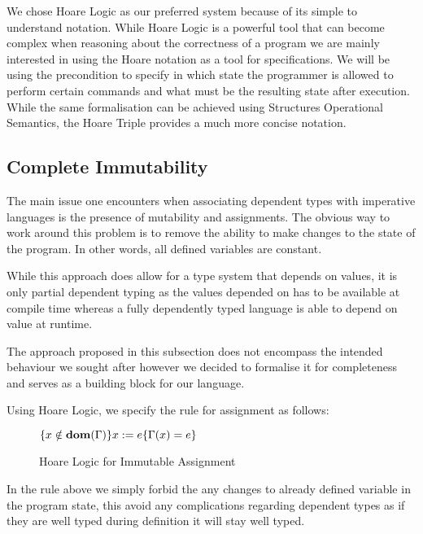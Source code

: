 \documentclass[a4paper,12pt]{report}
\begin{document}
\par
We chose Hoare Logic as our preferred system because of its simple to understand 
notation. While Hoare Logic is a powerful tool that can become complex when 
reasoning about the correctness of a program we are mainly interested in using 
the Hoare notation as a tool for specifications. We will be using the 
precondition to specify in which state the programmer is allowed to perform 
certain commands and what must be the resulting state after execution. While the 
same formalisation can be achieved using Structures Operational Semantics, the 
Hoare Triple provides a much more concise notation. 


\subsection{Complete Immutability}
The main issue one encounters when associating dependent types with imperative 
languages is the presence of mutability and assignments. The obvious way to 
work around this problem is to remove the ability to make changes to the state 
of the program. In other words, all defined variables are constant. 

\par
While this approach does allow for a type system that depends on values, it is 
only partial dependent typing as the values depended on has to be available at 
compile time whereas a fully dependently typed language is able to depend on 
value at runtime.

\par
The approach proposed in this subsection does not encompass the intended behaviour we 
sought after however we decided to formalise it for completeness and serves as 
a building block for our language. 

\par
Using Hoare Logic, we specify the rule for assignment as follows:

\begin{figure}[H]
  \begin{center}
    $\{x \notin \text{\textbf{dom}}(\Gamma)\}x := e\{\Gamma(x) = e\}$
  \end{center}  
  \caption{Hoare Logic for Immutable Assignment}
\end{figure}

In the rule above we simply forbid the any changes to already defined variable 
in the program state, this avoid any complications regarding dependent types as 
if they are well typed during definition it will stay well typed. 
\end{document}
